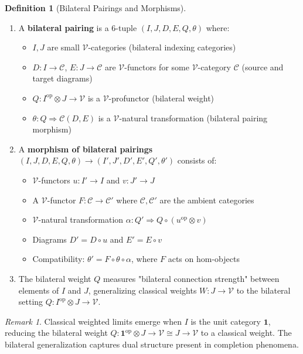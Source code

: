 \documentclass[11pt]{article}
\theoremstyle{plain}
\theoremstyle{definition}
\newtheorem{definition}[theorem]{Definition}
\theoremstyle{remark}
\newtheorem{remark}[theorem]{Remark}
\newcommand{\V}{\mathcal{V}}
\newcommand{\C}{\mathcal{C}}
\newcommand{\op}{\mathrm{op}}
\begin{document}
\begin{definition}[Bilateral Pairings and Morphisms]\label{def:bilateral-pairing}
\mbox{} \bigskip
\begin{enumerate}
\item A \textbf{bilateral pairing} is a 6-tuple $(I, J, D, E, Q, \theta)$ where:
\begin{itemize}
\item $I, J$ are small $\V$-categories (bilateral indexing categories)
\item $D : I \to \C$, $E : J \to \C$ are $\V$-functors for some $\V$-category $\C$ (source and target diagrams)
\item $Q : I^{\op} \otimes J \to \V$ is a $\V$-profunctor (bilateral weight)
\item $\theta : Q \Rightarrow \C(D, E)$ is a $\V$-natural transformation (bilateral pairing morphism)
\end{itemize}

\item A \textbf{morphism of bilateral pairings} $(I, J, D, E, Q, \theta) \to (I', J', D', E', Q', \theta')$ consists of:
\begin{itemize}
\item $\V$-functors $u : I' \to I$ and $v : J' \to J$
\item A $\V$-functor $F : \C \to \C'$ where $\C, \C'$ are the ambient categories
\item $\V$-natural transformation $\alpha : Q' \Rightarrow Q \circ (u^{\op} \otimes v)$
\item Diagrams $D' = D \circ u$ and $E' = E \circ v$
\item Compatibility: $\theta' = F \circ \theta \circ \alpha$, where $F$ acts on hom-objects
\end{itemize}

\item The bilateral weight $Q$ measures "bilateral connection strength" between elements of $I$ and $J$, generalizing classical weights $W : J \to \V$ to the bilateral setting $Q : I^{\op} \otimes J \to \V$.
\end{enumerate}
\end{definition}

\begin{remark}
Classical weighted limits emerge when $I$ is the unit category $\mathbf{1}$, reducing the bilateral weight $Q : \mathbf{1}^{\op} \otimes J \to \V \cong J \to \V$ to a classical weight. The bilateral generalization captures dual structure present in completion phenomena.
\end{remark}
\end{document}
